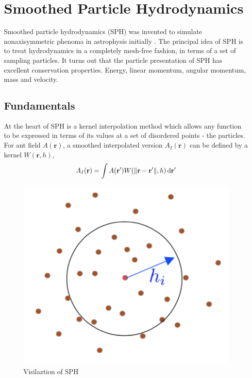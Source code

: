 \section{Smoothed Particle Hydrodynamics}
    Smoothed particle hydrodynamics (SPH) was invented to simulate nonaxisymmetric phenoma in astrophysis initially \cite{DBLP:journals/corr/GuWKMSSLWW15}. The principal idea of SPH is to treat hydrodynamics in a completely mesh-free fashion, in terms of a set of sampling particles. It turns out that the particle presentation of SPH has excellent conservation properties. Energy, linear momentum, angular momentum, mass and velocity.

    \subsection{Fundamentals}

    At the heart of SPH is a kernel interpolation method which allows any function to be expressed in terms of its values at a set of disordered points - the particles\cite{monaghan1992smoothed}. For ant field $A(\textbf{r})$, a smoothed interpolated version $A_{I}(\textbf{r})$ can be defined by a kernel $W(\textbf{r}, h)$,
    \begin{equation}
        A_{I}(\textbf{r}) = \int A({\textbf{r}}^{\prime})W(\|\textbf{r} - \textbf{r}^{\prime}\|, h)\,\mathrm{d}\textbf{r}^{\prime}
    \end{equation}
    \begin{figure}[!ht]
        \centering
        \includegraphics[scale = 0.6]{Figures/sph}
        \caption{Visilaztion of SPH}
    \end{figure}

